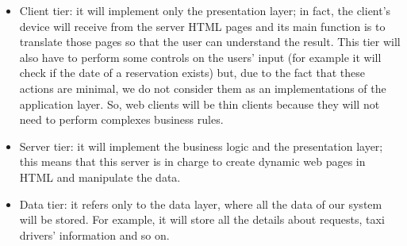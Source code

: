     \begin{itemize}
        \item Client tier: it will implement only the presentation layer; in fact, the client's device will receive from the server HTML pages and its main function is to translate those pages so that the user can understand the result. 
        \newline 
        This tier will also have to perform some controls on the users' input (for example it will check if the date of a reservation exists) but, due to the fact that these actions are minimal, we do not consider them as an implementations of the application layer. So, web clients will be thin clients because they will not need to perform complexes business rules.
        \item Server tier: it will implement the business logic and the presentation layer; this means that this server is in charge to create dynamic web pages in HTML and manipulate the data.
        \item Data tier: it refers only to the data layer, where all the data of our system will be stored. For example, it will store all the details about requests, taxi drivers' information and so on.
    \end{itemize}